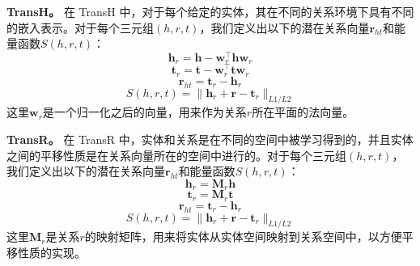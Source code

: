 \textbf{TransH。} 在 TransH 中，对于每个给定的实体，其在不同的关系环境下具有不同的嵌入表示。对于每个三元组$(h, r, t)$，我们定义出以下的潜在关系向量$\textbf{r}_{ht}$和能量函数$S(h,r,t)$：
\begin{equation}
\textbf{h}_r = \textbf{h} - \textbf{w}_r^{\top} \textbf{h} \textbf{w}_r
\end{equation}
\begin{equation}
\textbf{t}_r = \textbf{t} - \textbf{w}_r^{\top} \textbf{t} \textbf{w}_r
\end{equation}
\begin{equation}
\textbf{r}_{ht} = \textbf{t}_r - \textbf{h}_r
\end{equation}
\begin{equation}
S(h, r, t) = \lVert \textbf{h}_r + \textbf{r} - \textbf{t}_r \rVert_{L1/L2}
\end{equation}
这里$\textbf{w}_r$是一个归一化之后的向量，用来作为关系$r$所在平面的法向量。

\textbf{TransR。} 在 TransR 中，实体和关系是在不同的空间中被学习得到的，并且实体之间的平移性质是在关系向量所在的空间中进行的。对于每个三元组$(h, r, t)$，我们定义出以下的潜在关系向量$\textbf{r}_{ht}$和能量函数$S(h,r,t)$：
\begin{equation}
\textbf{h}_r = \textbf{M}_r \textbf{h}
\end{equation}
\begin{equation}
\textbf{t}_r = \textbf{M}_r \textbf{t}
\end{equation}
\begin{equation}
\textbf{r}_{ht} = \textbf{t}_r - \textbf{h}_r
\end{equation}
\begin{equation}
S(h, r, t) = \lVert \textbf{h}_r + \textbf{r} - \textbf{t}_r \rVert_{L1/L2}
\end{equation}
这里$\textbf{M}_r$是关系$r$的映射矩阵，用来将实体从实体空间映射到关系空间中，以方便平移性质的实现。

